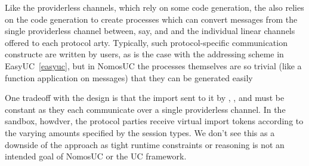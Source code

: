 Like the providerless channels, which rely on some code generation, the \partywrapper also relies on the code generation to create processes which can convert messages from the single providerless channel between, say, \partywrapper and \F  and the individual linear channels offered to each protocol arty.
Typically, such protocol-specific communication constructe are written by users, as is the case with the addressing scheme in EasyUC~\ref{easyuc}, but in NomosUC the processes themselves are so trivial (like a function application on messages) that they can be generated easily

One tradeoff with the \partywrapper design is that the import sent to it by \F, \Z, and \A must be constant as they each communicate over a single providerless channel.  
In the sandbox, howdver, the protocol parties receive virtual import tokens according to the varying amounts specified by the session types.
We don't see this as a downside of the approach as tight runtime constraints or reasoning is not an intended goal of NomosUC or the UC framework.



